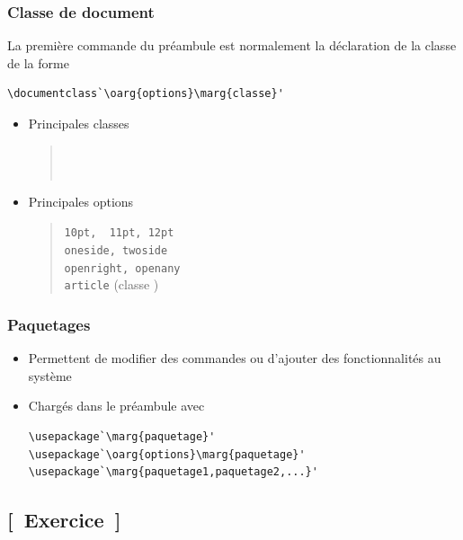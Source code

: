 \begin{frame}[fragile]
  \frametitle{Classe de document}

  La première commande du préambule est normalement la déclaration de
  la classe de la forme
\begin{lstlisting}
\documentclass`\oarg{options}\marg{classe}'
\end{lstlisting}

  \begin{itemize}
  \item Principales classes
    \begin{quote}
       \\
      {\color{alert} } \\
      {\color{alert} }
    \end{quote}
  \item Principales options
    \begin{quote}
      \texttt{10pt, {\color{alert} 11pt}, 12pt} \\
      \texttt{oneside, twoside} \\
      \texttt{openright, openany} \\
      {\color{alert} \texttt{article}} (classe )
    \end{quote}
  \end{itemize}
\end{frame}

\begin{frame}[fragile=singleslide]
  \frametitle{Paquetages}
  \begin{itemize}
  \item Permettent de modifier des commandes ou d'ajouter des
    fonctionnalités au système
  \item Chargés dans le préambule avec
    \begin{lstlisting}
\usepackage`\marg{paquetage}'
\usepackage`\oarg{options}\marg{paquetage}'
\usepackage`\marg{paquetage1,paquetage2,...}'
    \end{lstlisting}
  \end{itemize}
\end{frame}

\subsection{[~Exercice~]}

